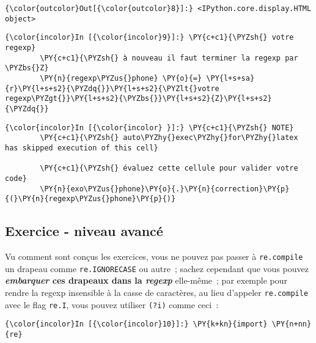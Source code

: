 \begin{Verbatim}[commandchars=\\\{\}]
{\color{outcolor}Out[{\color{outcolor}8}]:} <IPython.core.display.HTML object>
\end{Verbatim}
            
    \begin{Verbatim}[commandchars=\\\{\}]
{\color{incolor}In [{\color{incolor}9}]:} \PY{c+c1}{\PYZsh{} votre regexp}
        \PY{c+c1}{\PYZsh{} à nouveau il faut terminer la regexp par \PYZbs{}Z}
        \PY{n}{regexp\PYZus{}phone} \PY{o}{=} \PY{l+s+sa}{r}\PY{l+s+s2}{\PYZdq{}}\PY{l+s+s2}{\PYZlt{}votre regexp\PYZgt{}}\PY{l+s+s2}{\PYZbs{}}\PY{l+s+s2}{Z}\PY{l+s+s2}{\PYZdq{}}
\end{Verbatim}


    \begin{Verbatim}[commandchars=\\\{\}]
{\color{incolor}In [{\color{incolor} }]:} \PY{c+c1}{\PYZsh{} NOTE}
        \PY{c+c1}{\PYZsh{} auto\PYZhy{}exec\PYZhy{}for\PYZhy{}latex has skipped execution of this cell}
        
        \PY{c+c1}{\PYZsh{} évaluez cette cellule pour valider votre code}
        \PY{n}{exo\PYZus{}phone}\PY{o}{.}\PY{n}{correction}\PY{p}{(}\PY{n}{regexp\PYZus{}phone}\PY{p}{)}
\end{Verbatim}


    \hypertarget{exercice---niveau-avancuxe9}{%
\subsection{Exercice - niveau
avancé}\label{exercice---niveau-avancuxe9}}

    Vu comment sont conçus les exercices, vous ne pouvez pas passer à
\texttt{re.compile} un drapeau comme \texttt{re.IGNORECASE} ou autre~;
sachez cependant que vous pouvez \textbf{\emph{embarquer} ces drapeaux
dans la \emph{regexp}} elle-même~; par exemple pour rendre la regexp
insensible à la casse de caractères, au lieu d'appeler
\texttt{re.compile} avec le flag \texttt{re.I}, vous pouvez utiliser
\texttt{(?i)} comme ceci~:

    \begin{Verbatim}[commandchars=\\\{\}]
{\color{incolor}In [{\color{incolor}10}]:} \PY{k+kn}{import} \PY{n+nn}{re}
\end{Verbatim}


